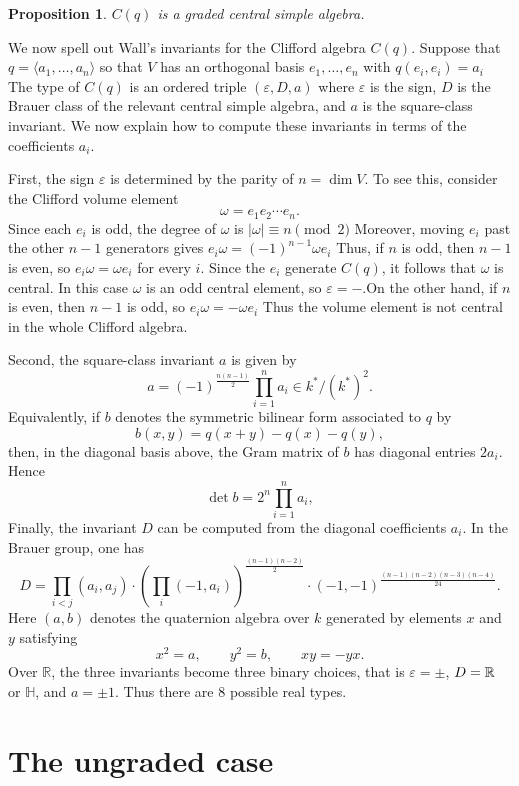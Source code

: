 \documentclass{amsart}
\numberwithin{equation}{section}
\theoremstyle{plain} %
\newtheorem{proposition}[equation]{Proposition}
\theoremstyle{definition}
\theoremstyle{remark}
\begin{document}
\begin{proposition}
    $C(q)$ is a graded central simple algebra. 
\end{proposition}

We now spell out Wall's invariants for the Clifford algebra $C(q)$. Suppose
that $q=\langle a_1,\ldots,a_n\rangle$
so that $V$ has an orthogonal basis $e_1,\ldots,e_n$ with $q(e_i,e_i)=a_i$
The type of $C(q)$ is an ordered triple $(\varepsilon,D,a)$ where $\varepsilon$ is the sign, $D$ is the Brauer class of the relevant central simple algebra, and $a$ is the square-class invariant. We now explain how to compute these invariants in terms of the coefficients $a_i$.

First, the sign $\varepsilon$ is determined by the parity of $n=\dim V$. To see this, consider the Clifford volume element
\[
    \omega=e_1e_2\cdots e_n.
\]
Since each $e_i$ is odd, the degree of $\omega$ is $|\omega|\equiv n \pmod 2$
Moreover, moving $e_i$ past the other $n-1$ generators gives $e_i\omega=(-1)^{n-1}\omega e_i$
Thus, if $n$ is odd, then $n-1$ is even, so $e_i\omega=\omega e_i$
for every $i$. Since the $e_i$ generate $C(q)$, it follows that $\omega$ is
central. In this case $\omega$ is an odd central element, so $\varepsilon=-$.On the other hand, if $n$ is even, then $n-1$ is odd, so $e_i\omega=-\omega e_i$
Thus the volume element is not central in the whole Clifford algebra. 

Second, the square-class invariant $a$ is given by
\[
    a=
    (-1)^{\frac{n(n-1)}{2}}\prod_{i=1}^n a_i
    \in k^*/(k^*)^2.
\]
Equivalently, if $b$ denotes the symmetric bilinear form associated to $q$ by
\[
    b(x,y)=q(x+y)-q(x)-q(y),
\]
then, in the diagonal basis above, the Gram matrix of $b$ has diagonal entries
$2a_i$. Hence
\[
    \det b=2^n\prod_{i=1}^n a_i,
\]
Finally, the invariant $D$ can be computed from the diagonal coefficients
$a_i$. In the Brauer group, one has
\[
    D
    =
    \prod_{i<j}(a_i,a_j)
    \cdot
    \left(\prod_i(-1,a_i)\right)^{\frac{(n-1)(n-2)}{2}}
    \cdot
    (-1,-1)^{\frac{(n-1)(n-2)(n-3)(n-4)}{24}}.
\]
Here $(a,b)$ denotes the quaternion algebra over $k$ generated by elements
$x$ and $y$ satisfying
\[
    x^2=a,
    \qquad
    y^2=b,
    \qquad
    xy=-yx.
\]
Over $\mathbb R$, the three invariants become three binary choices, that is $\varepsilon=\pm$, $D=\mathbb{R}$ or $\mathbb{H}$, and $a=\pm 1$. Thus there are $8$ possible real types.
\section{The ungraded case}
\end{document}
